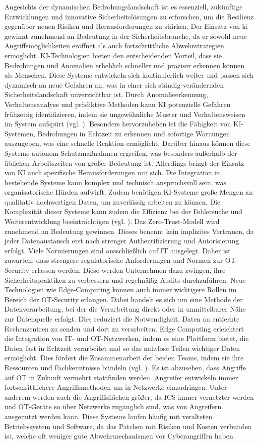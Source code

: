 Angesichts der dynamischen Bedrohungslandschaft ist es essenziell, zukünftige Entwicklungen und innovative Sicherheitslösungen zu erforschen, um die Resilienz gegenüber neuen Risiken und Herausforderungen zu stärken. Der Einsatz von \ac{ki} gewinnt zunehmend an Bedeutung in der Sicherheitsbranche, da er sowohl neue Angriffsmöglichkeiten eröffnet als auch fortschrittliche Abwehrstrategien ermöglicht. KI-Technologien bieten den entscheidenden Vorteil, dass sie Bedrohungen und Anomalien erheblich schneller und präziser erkennen können als Menschen. Diese Systeme entwickeln sich kontinuierlich weiter und passen sich dynamisch an neue Gefahren an, was in einer sich ständig verändernden Sicherheitslandschaft unverzichtbar ist. Durch Anomalieerkennung, Verhaltensanalyse und prädiktive Methoden kann KI potenzielle Gefahren frühzeitig identifizieren, indem sie ungewöhnliche Muster und Verhaltensweisen im System aufspürt (vgl. \cite{hornetsec}). Besonders hervorzuheben ist die Fähigkeit von KI-Systemen, Bedrohungen in Echtzeit zu erkennen und sofortige Warnungen auszugeben, was eine schnelle Reaktion ermöglicht. Darüber hinaus können diese Systeme autonom Schutzmaßnahmen ergreifen, was besonders außerhalb der üblichen Arbeitszeiten von großer Bedeutung ist. Allerdings bringt der Einsatz von KI auch spezifische Herausforderungen mit sich. Die Integration in bestehende Systeme kann komplex und technisch anspruchsvoll sein, was organisatorische Hürden aufwirft. Zudem benötigen KI-Systeme große Mengen an qualitativ hochwertigen Daten, um zuverlässig arbeiten zu können. Die Komplexität dieser Systeme kann zudem die Effizienz bei der Fehlersuche und Weiterentwicklung beeinträchtigen (vgl. \cite{itPort}). Das Zero-Trust-Modell wird zunehmend an Bedeutung gewinnen. Dieses benennt kein implizites Vertrauen, da jeder Datenaustausch erst nach strenger Authentifizierung und Autorisierung erfolgt. Viele Normierungen sind ausschließlich auf IT ausgelegt. Daher ist zuwarten, dass strengere regulatorische Anforderungen und Normen zur OT-Security erlassen werden. Diese werden Unternehmen dazu zwingen, ihre Sicherheitspraktiken zu verbessern und regelmäßig Audits durchzuführen. Neue Technologien wie Edge-Computing können auch immer wichtigere Rollen im Bereich der OT-Security erlangen. Dabei handelt es sich um eine Methode der Datenverarbeitung, bei der die Verarbeitung direkt oder in unmittelbarer Nähe zur Datenquelle erfolgt. Dies reduziert die Notwendigkeit, Daten an entfernte Rechenzentren zu senden und dort zu verarbeiten. Edge Computing erleichtert die Integration von IT- und OT-Netzwerken, indem es eine Plattform bietet, die Daten fast in Echtzeit verarbeitet und so das nahtlose Teilen wichtiger Daten ermöglicht. Dies fördert die Zusammenarbeit der beiden Teams, indem sie ihre Ressourcen und Fachkenntnisse bündeln (vgl. \cite{stratus}). Es ist abzusehen, dass Angriffe auf OT in Zukunft vermehrt stattfinden werden. Angreifer entwickeln immer fortschrittlichere Angriffsmethoden um in Netzwerke einzudringen. Unter anderem werden auch die Angriffsflächen größer, da ICS immer vernetzter werden und OT-Geräte so über Netzwerke zugänglich sind, was von Angreifern ausgenutzt werden kann. Diese Systeme laufen häufig mit veralteten Betriebssystem und Software, da das Patchen mit Risiken und Kosten verbunden ist, welche oft weniger gute Abwehrmechanismen vor Cyberangriffen haben. 

